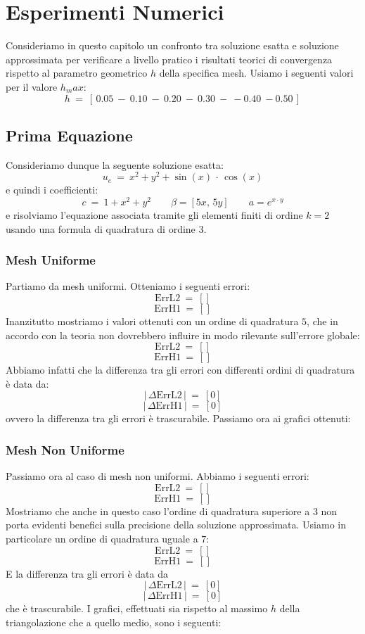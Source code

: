 \documentclass[12pt,a4paper]{report}
\theoremstyle{theorem}
\theoremstyle{theorem}
\theoremstyle{definition}
\providecommand{\abs}[1]{\lvert \, #1 \, \rvert}
\begin{document}
\chapter{Esperimenti Numerici}
Consideriamo in questo capitolo un confronto tra soluzione esatta e soluzione approssimata per verificare a livello pratico i risultati teorici di convergenza rispetto al parametro geometrico $h$ della specifica mesh. Usiamo i seguenti valori per il valore $h_max$:
\[ 
h \ = \ [ \, 0.05 \ - \ 0.10 \ - \ 0.20 \ - \ 0.30 \ - \ - 0.40 \ - 0.50 \, ] \]

\section{Prima Equazione}
Consideriamo dunque la seguente soluzione esatta:
\[ u_e \ = \ x^2 + y^2 + \sin(x) \, \cdot \, \cos(x) \]
e quindi i coefficienti:
\[ c \ = \ 1 + x^2 + y^2 \qquad \beta = [5x, \, 5y] \qquad a = e^{x \cdot y} \]
e risolviamo l'equazione associata tramite gli elementi finiti di ordine $k = 2$ usando una formula di quadratura di ordine $3$. 

\subsection{Mesh Uniforme}
Partiamo da mesh uniformi. Otteniamo i seguenti errori:
\[ \text{ErrL2} \ = \ [] \]
\[ \text{ErrH1} \ = \ [] \]
Inanzitutto mostriamo i valori ottenuti con un ordine di quadratura $5$, che in accordo con la teoria non dovrebbero influire in modo rilevante sull'errore globale:
\[ \text{ErrL2} \ = \ [] \]
\[ \text{ErrH1} \ = \ [] \]
Abbiamo infatti che la differenza tra gli errori con differenti ordini di quadratura è data da:
\[ \abs{ \Delta \text{ErrL2}} \ = \ [0] \]
\[ \abs{ \Delta \text{ErrH1}} \ = \ [0] \]
ovvero la differenza tra gli errori è trascurabile. Passiamo ora ai grafici ottenuti:

\subsection{Mesh Non Uniforme}
Passiamo ora al caso di mesh non uniformi. Abbiamo i seguenti errori:
\[ \text{ErrL2} \ = \ [] \]
\[ \text{ErrH1} \ = \ [] \]
Mostriamo che anche in questo caso l'ordine di quadratura superiore a $3$ non porta evidenti benefici sulla precisione della soluzione approssimata. Usiamo in particolare un ordine di quadratura uguale a $7$:
\[ \text{ErrL2} \ = \ [] \]
\[ \text{ErrH1} \ = \ [] \]
E la differenza tra gli errori è data da
\[ \abs{ \Delta \text{ErrL2}} \ = \ [0] \]
\[ \abs{ \Delta \text{ErrH1}} \ = \ [0] \]
che è trascurabile. I grafici, effettuati sia rispetto al massimo $h$ della triangolazione che a quello medio, sono i seguenti:
\end{document}
